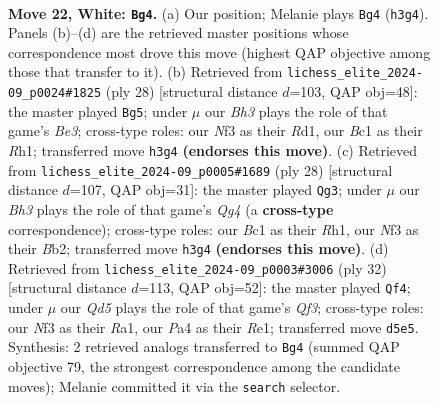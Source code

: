 \documentclass[11pt]{article}
\begin{document}
\clearpage

\begin{figure}[p]\centering
\begin{subfigure}{0.46\textwidth}\centering
\resizebox{\linewidth}{!}{%
\newchessgame
\chessboard[
  setfen={2bqrb1k/rp1ppp1p/p2n4/3Q4/P1PP4/2N2N1B/1P3P1P/R1B2RK1 w - - 1 22},
  showmover=false,
  pgfstyle=straightmove, color=movearrow, markmove={h3-g4}
]}
\caption{}
\end{subfigure}\hfill
\begin{subfigure}{0.46\textwidth}\centering
\resizebox{\linewidth}{!}{%
\newchessgame
\chessboard[
  setfen={r1b2rk1/pp2bp1p/1nn3p1/q1p1P3/4Q3/2NBBN2/PP3PPP/2KR3R w - - 0 15},
  showmover=false,
  pgfstyle=straightmove, color=movearrow, markmove={e3-g5}
]}
\caption{}
\end{subfigure}
\\[4pt]
\begin{subfigure}{0.46\textwidth}\centering
\resizebox{\linewidth}{!}{%
\newchessgame
\chessboard[
  setfen={r1b1qr1k/ppn3pp/2n1pb2/3p4/2P3QP/1PNB1N2/PB3PP1/2KR3R w - - 0 15},
  showmover=false,
  pgfstyle=straightmove, color=movearrow, markmove={g4-g3}
]}
\caption{}
\end{subfigure}\hfill
\begin{subfigure}{0.46\textwidth}\centering
\resizebox{\linewidth}{!}{%
\newchessgame
\chessboard[
  setfen={r3r1k1/4bppp/pqp1bn2/3pB3/8/1P1N1Q2/P1PN1PPP/R3R1K1 w - - 4 17},
  showmover=false,
  pgfstyle=straightmove, color=movearrow, markmove={f3-f4}
]}
\caption{}
\end{subfigure}
\caption{\textbf{Move 22, White: \texttt{Bg4}.} (a) Our position; Melanie plays \texttt{Bg4} (\texttt{h3g4}). Panels (b)--(d) are the retrieved master positions whose correspondence most drove this move (highest QAP objective among those that transfer to it). (b) Retrieved from \texttt{lichess\_elite\_2024-09\_p0024\#1825} (ply 28) [structural distance $d$=103, QAP obj=48]: the master played \texttt{Bg5}; under $\mu$ our \emph{Bh3} plays the role of that game's \emph{Be3}; cross-type roles: our \emph{N}f3 as their \emph{R}d1, our \emph{B}c1 as their \emph{R}h1; transferred move \texttt{h3g4} \textbf{(endorses this move)}. (c) Retrieved from \texttt{lichess\_elite\_2024-09\_p0005\#1689} (ply 28) [structural distance $d$=107, QAP obj=31]: the master played \texttt{Qg3}; under $\mu$ our \emph{Bh3} plays the role of that game's \emph{Qg4} (a \textbf{cross-type} correspondence); cross-type roles: our \emph{B}c1 as their \emph{R}h1, our \emph{N}f3 as their \emph{B}b2; transferred move \texttt{h3g4} \textbf{(endorses this move)}. (d) Retrieved from \texttt{lichess\_elite\_2024-09\_p0003\#3006} (ply 32) [structural distance $d$=113, QAP obj=52]: the master played \texttt{Qf4}; under $\mu$ our \emph{Qd5} plays the role of that game's \emph{Qf3}; cross-type roles: our \emph{N}f3 as their \emph{R}a1, our \emph{P}a4 as their \emph{R}e1; transferred move \texttt{d5e5}. Synthesis: 2 retrieved analogs transferred to \texttt{Bg4} (summed QAP objective 79, the strongest correspondence among the candidate moves); Melanie committed it via the \texttt{search} selector.}
\label{fig:thought-m42}
\end{figure}
\end{document}
